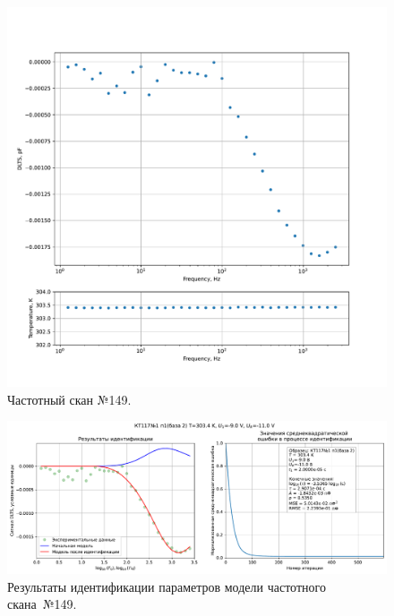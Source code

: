\begin{figure}[!ht]
    \centering
    \includegraphics[width=1\textwidth]{../plots/КТ117№1_п1(база 2)_2500Гц-1Гц_1пФ_+30С_-9В-11В_20мВ_20мкс_шаг_0,1.pdf}
    \caption{Частотный скан №149.}
    \label{pic:frequency_scan_149}
\end{figure}

\begin{figure}[!ht]
    \centering
    \includegraphics[width=1\textwidth]{../plots/КТ117№1_п1(база 2)_2500Гц-1Гц_1пФ_+30С_-9В-11В_20мВ_20мкс_шаг_0,1_model.pdf}
    \caption{Результаты идентификации параметров модели частотного скана~№149.}
    \label{pic:frequency_scan_model149}
\end{figure}

\pagebreak


